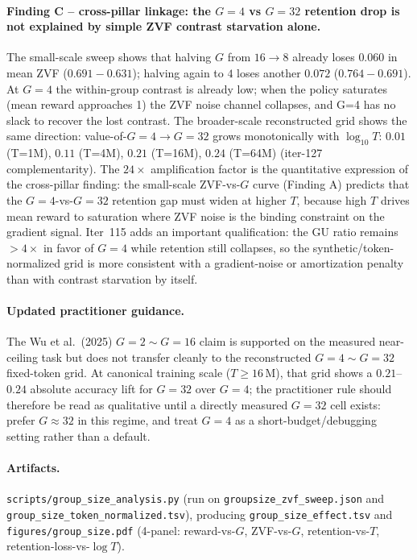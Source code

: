 \paragraph{Finding C -- cross-pillar linkage: the $G{=}4$ vs $G{=}32$
retention drop is not explained by simple ZVF contrast starvation alone.}
The small-scale sweep shows that halving $G$ from $16 \to 8$ already
loses $0.060$ in mean ZVF ($0.691 - 0.631$); halving again to $4$
loses another $0.072$ ($0.764 - 0.691$). At $G{=}4$ the within-group
contrast is already low; when the policy saturates (mean reward
approaches 1) the ZVF noise channel collapses, and G=4 has no slack
to recover the lost contrast. The broader-scale reconstructed grid shows the
same direction:
value-of-$G{=}4 \to G{=}32$ grows monotonically with $\log_{10}T$:
$0.01$ (T=1M), $0.11$ (T=4M), $0.21$ (T=16M), $0.24$ (T=64M)
(iter-127 complementarity). The $24\times$ amplification factor
is the quantitative expression of the cross-pillar finding: the
small-scale ZVF-vs-$G$ curve (Finding A) predicts that the
$G{=}4$-vs-$G{=}32$ retention gap must widen at higher $T$, because
high $T$ drives mean reward to saturation where ZVF noise is the
binding constraint on the gradient signal. Iter~115 adds an important
qualification: the GU ratio remains $>4\times$ in favor of $G{=}4$ while
retention still collapses, so the synthetic/token-normalized grid is more
consistent with a gradient-noise or amortization penalty than with contrast
starvation by itself.

\paragraph{Updated practitioner guidance.}
The Wu et al.\ (2025) $G{=}2 \sim G{=}16$ claim is supported on the
measured near-ceiling task but does not transfer cleanly to the reconstructed
$G{=}4 \sim G{=}32$ fixed-token grid. At canonical training scale
($T \ge 16\,$M), that grid shows a $0.21$--$0.24$ absolute accuracy lift for
$G{=}32$ over $G{=}4$; the practitioner rule should therefore be read as
qualitative until a directly measured $G{=}32$ cell exists: prefer
$G{\approx}32$ in this regime, and treat $G{=}4$ as a short-budget/debugging
setting rather than a default.

\paragraph{Artifacts.}
\texttt{scripts/group\_size\_analysis.py} (run on
\texttt{groupsize\_zvf\_sweep.json} and
\texttt{group\_size\_token\_normalized.tsv}), producing
\texttt{group\_size\_effect.tsv} and
\texttt{figures/group\_size.pdf} (4-panel: reward-vs-$G$,
ZVF-vs-$G$, retention-vs-$T$, retention-loss-vs-$\log T$).

